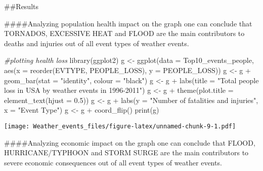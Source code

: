 \documentclass[
]{article}
\newenvironment{Shaded}{\begin{snugshade}}{\end{snugshade}}
\newcommand{\AttributeTok}[1]{\textcolor[rgb]{0.77,0.63,0.00}{#1}}
\newcommand{\CommentTok}[1]{\textcolor[rgb]{0.56,0.35,0.01}{\textit{#1}}}
\newcommand{\FloatTok}[1]{\textcolor[rgb]{0.00,0.00,0.81}{#1}}
\newcommand{\FunctionTok}[1]{\textcolor[rgb]{0.00,0.00,0.00}{#1}}
\newcommand{\NormalTok}[1]{#1}
\newcommand{\OtherTok}[1]{\textcolor[rgb]{0.56,0.35,0.01}{#1}}
\newcommand{\SpecialCharTok}[1]{\textcolor[rgb]{0.00,0.00,0.00}{#1}}
\newcommand{\StringTok}[1]{\textcolor[rgb]{0.31,0.60,0.02}{#1}}
\begin{document}
\#\#Results

\#\#\#\#Analyzing population health impact on the graph one can conclude
that TORNADOS, EXCESSIVE HEAT and FLOOD are the main contributors to
deaths and injuries out of all event types of weather events.

\begin{Shaded}
\begin{Highlighting}[]
\CommentTok{\#plotting health loss}
\FunctionTok{library}\NormalTok{(ggplot2)}
\NormalTok{g }\OtherTok{\textless{}{-}} \FunctionTok{ggplot}\NormalTok{(}\AttributeTok{data =}\NormalTok{ Top10\_events\_people, }\FunctionTok{aes}\NormalTok{(}\AttributeTok{x =} \FunctionTok{reorder}\NormalTok{(EVTYPE, PEOPLE\_LOSS), }\AttributeTok{y =}\NormalTok{ PEOPLE\_LOSS))}
\NormalTok{g }\OtherTok{\textless{}{-}}\NormalTok{ g }\SpecialCharTok{+} \FunctionTok{geom\_bar}\NormalTok{(}\AttributeTok{stat =} \StringTok{"identity"}\NormalTok{, }\AttributeTok{colour =} \StringTok{"black"}\NormalTok{)}
\NormalTok{g }\OtherTok{\textless{}{-}}\NormalTok{ g }\SpecialCharTok{+} \FunctionTok{labs}\NormalTok{(}\AttributeTok{title =} \StringTok{"Total people loss in USA by weather events in 1996{-}2011"}\NormalTok{)}
\NormalTok{g }\OtherTok{\textless{}{-}}\NormalTok{ g }\SpecialCharTok{+} \FunctionTok{theme}\NormalTok{(}\AttributeTok{plot.title =} \FunctionTok{element\_text}\NormalTok{(}\AttributeTok{hjust =} \FloatTok{0.5}\NormalTok{))}
\NormalTok{g }\OtherTok{\textless{}{-}}\NormalTok{ g }\SpecialCharTok{+} \FunctionTok{labs}\NormalTok{(}\AttributeTok{y =} \StringTok{"Number of fatalities and injuries"}\NormalTok{, }\AttributeTok{x =} \StringTok{"Event Type"}\NormalTok{)}
\NormalTok{g }\OtherTok{\textless{}{-}}\NormalTok{ g }\SpecialCharTok{+} \FunctionTok{coord\_flip}\NormalTok{()}
\FunctionTok{print}\NormalTok{(g)}
\end{Highlighting}
\end{Shaded}

\texttt{[image: Weather\_events\_files/figure-latex/unnamed-chunk-9-1.pdf]}

\#\#\#\#Analyzing economic impact on the graph one can conclude that
FLOOD, HURRICANE/TYPHOON and STORM SURGE are the main contributors to
severe economic consequences out of all event types of weather events.
\end{document}
